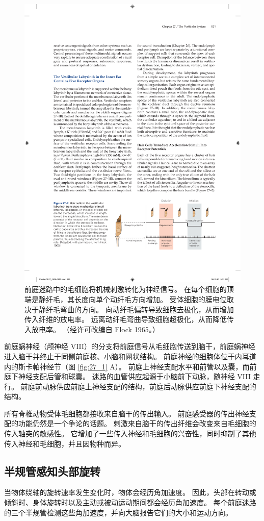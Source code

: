 \begin{figure}[htbp]
	\centering
	\includegraphics[width=0.7\linewidth]{chap27/fig_27_2}
	\caption{前庭迷路中的毛细胞将机械刺激转化为神经信号。 在每个细胞的顶端是静纤毛，其长度向单个动纤毛方向增加。 受体细胞的膜电位取决于静纤毛弯曲的方向。 向动纤毛偏转导致细胞去极化，从而增加传入纤维的放电率。 远离动纤毛弯曲导致细胞超极化，从而降低传入放电率。 （经许可改编自 Flock 1965。）}
	\label{fig:27_2}
\end{figure}

前庭蜗神经（颅神经 VIII）的分支将前庭信号从毛细胞传送到脑干，前庭蜗神经进入脑干并终止于同侧前庭核、小脑和网状结构。 前庭神经的细胞体位于内耳道内的斯卡帕神经节（图 \ref{fig:27_1} A）。 前庭上神经支配水平和前管以及囊，而前庭下神经支配后管和球囊。 迷路的血管供应起源于小脑前下动脉，随神经 VIII 走行。 前庭前动脉供应前庭上神经支配的结构，前庭后动脉供应前庭下神经支配的结构。

所有脊椎动物受体毛细胞都接收来自脑干的传出输入。 前庭感受器的传出神经支配的功能仍然是一个争论的话题。 刺激来自脑干的传出纤维会改变来自毛细胞的传入轴突的敏感性。 它增加了一些传入神经和毛细胞的兴奋性，同时抑制了其他传入神经和毛细胞，并且因物种而异。

\subsection{半规管感知头部旋转}
当物体绕轴的旋转速率发生变化时，物体会经历角加速度。 因此，头部在转动或倾斜时、身体旋转时以及主动或被动运动期间都会经历角加速度。 每个前庭迷路的三个半规管检测这些角加速度，并向大脑报告它们的大小和运动方向。

